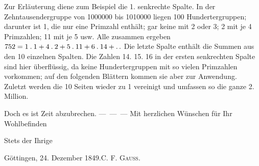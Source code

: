 Zur Erläuterung diene zum Beispiel die 1. senkrechte Spalte. In der Zehntausendergruppe von 1000000 bis 1010000 liegen 100 Hundertergruppen; darunter ist 1, die nur eine Primzahl enthält; gar keine mit 2 oder 3; 2 mit je 4 Primzahlen; 11 mit je 5 usw. Alle zusammen ergeben $752=1\mathbin{.}1+4\mathbin{.}2+5\mathbin{.}11+6\mathbin{.}14+\mathinner{.\,.}$ Die letzte Spalte enthält die Summen aus den 10 einzelnen Spalten. Die Zahlen 14. 15. 16 in der ersten senkrechten Spalte sind hier überflüssig, da keine Hundertergruppen mit so vielen Primzahlen vorkommen; auf den folgenden Blättern kommen sie aber zur Anwendung. Zuletzt werden die 10 Seiten wieder zu 1 vereinigt und umfassen so die ganze 2. Million.

Doch es ist Zeit abzubrechen. \mbox{— — —} Mit herzlichen Wünschen für Ihr Wohlbefinden
\begin{center}Stets der Ihrige\end{center}
\noindent Göttingen, 24. Dezember 1849.\hfill C. F. \textsc{Gauss}.
\par\endgroup

